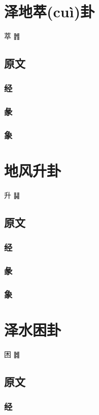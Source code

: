 \documentclass[12pt,oneside]{book}
\begin{document}
\chapter{泽地萃(cuì)卦}
萃 {\Large ䷬}
\section{原文}

\subsection{经}

\subsection{彖}

\subsection{象}

\chapter{地风升卦}
升 {\Large ䷭}

\section{原文}

\subsection{经}

\subsection{彖}

\subsection{象}

\chapter{泽水困卦}
困 {\Large ䷮}
\section{原文}

\subsection{经}
\end{document}
